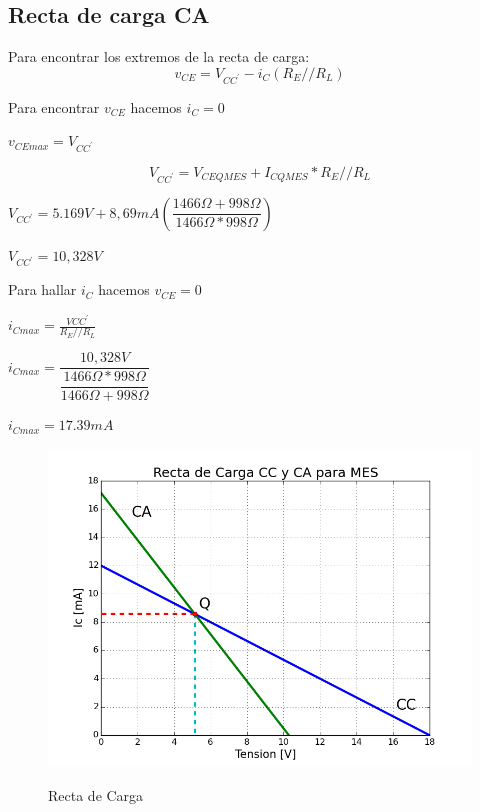 \documentclass[12pt]{article}
\begin{document}
 

\subsection{Recta de carga CA}

Para encontrar los extremos de la recta de carga:
\begin{equation}
  v_{CE}=V_{CC^{'}}-i_{C}(R_E//R_L)
\end{equation}

Para encontrar $v_{CE}$ hacemos $i_C=0$
\begin{center}
  $v_{CE max}=V_{CC^{'}}$
\end{center}

\begin{equation}
  V_{CC^{'}}=V_{CEQMES}+I_{CQMES}*R_E//R_L
\end{equation}
\begin{center}
 $V_{CC^{'}}=5.169V+8,69mA(\dfrac{1466\Omega+998\Omega}{1466\Omega*998\Omega})$
\vspace{0.2cm} 

$V_{CC^{'}}=10,328V$

\end{center}
  
Para hallar $i_{C}$ hacemos $v_{CE}=0$
\begin{center}
  $i_{C max}=\frac{V{CC^{'}}}{R_E//R_L}$
  
  $i_{C max}=\dfrac{10,328V}{\dfrac{1466\Omega*998\Omega}{1466\Omega+998\Omega}}$
\vspace{0.2cm} 

 $i_{C max}=17.39mA$
\end{center}

  
\begin{figure}[ht]
\centering 
\includegraphics[scale = 0.6]{RectaCCCA.png}\\[0.25 cm]	%
\caption{Recta de Carga}
\label{Figura 5}
\end{figure}
\end{document}
